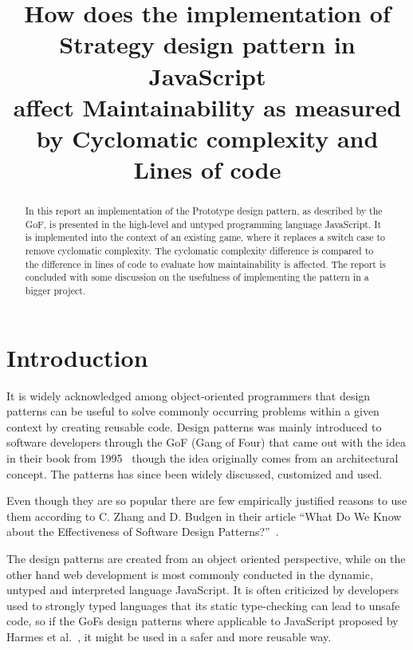 \documentclass[conference, a4paper]{IEEEtran}
\begin{document}
\title{How does the implementation of\\
Strategy design pattern in JavaScript\\
affect Maintainability as measured by Cyclomatic complexity and Lines of code}
\author{
}

\maketitle

\begin{abstract}
	 In this report an implementation of the Prototype design pattern, as described by the GoF, is presented in the high-level and untyped programming language JavaScript. It is implemented into the context of an existing game, where it replaces a switch case to remove cyclomatic complexity. The cyclomatic complexity difference is compared to the difference in lines of code to evaluate how maintainability is affected. The report is concluded with some discussion on the usefulness of implementing the pattern in a bigger project.  
\end{abstract}

\section{Introduction}
\label{sec:Introduction}
It is widely acknowledged among object-oriented programmers that design patterns can be useful to solve commonly occurring problems within a given context  by creating reusable code. Design patterns was mainly introduced to software developers through the GoF (Gang of Four) that came out with the idea in their book from 1995~\cite{bibitem:GoF} though the idea originally comes from an architectural concept. The patterns has since been widely discussed, customized and used.

Even though they are so popular there are few empirically justified reasons to use them according to C. Zhang and D. Budgen in their article ``What Do We Know about the Effectiveness of Software Design Patterns?''~\cite{bibitem:Zhang}.

The design patterns are created from an object oriented perspective, while on the other hand web development is most commonly conducted in the dynamic, untyped and interpreted language JavaScript. It is often criticized by developers used to strongly typed languages that its static type-checking can lead to unsafe code, so if the GoFs design patterns where applicable to JavaScript proposed by Harmes et al.~\cite{bibitem:DiazHarmes}, it might be used in a safer and more reusable way.
\end{document}
